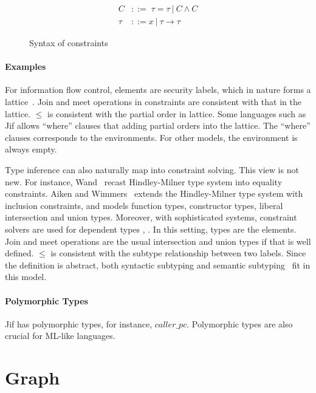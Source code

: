 
\begin{figure}[b]
\begin{align*}
C &::=\; \tau = \tau\ |\ C \land C \\
\tau &::= x\ |\ \tau\rightarrow \tau
\end{align*}
\caption{Syntax of constraints}
\label{figure:cons:syntax}
\end{figure}

\paragraph{Examples}

For information flow control, elements are security labels, which in
nature forms a lattice~\cite{denning-lattice}. Join and meet
operations in constraints are consistent with that in the lattice.
$\leq$ is consistent with the partial order in lattice. Some languages
such as Jif allows ``where'' clauses that adding partial orders into
the lattice. The ``where'' clauses corresponds to the environments.
For other models, the environment is always empty.

Type inference can also naturally map into constraint solving. This
view is not new. For instance, Wand~\cite{wand-typeinference}
recast Hindley-Milner type system into equality constraints. Aiken and
Wimmers~\cite{aiken-typeinclusion} extends the Hindley-Milner type
system with inclusion constraints, and models function types,
constructor types, liberal intersection and union types. Moreover,
with sophisticated systems, constraint solvers are used for dependent
types , . In this setting, types are the
elements. Join and meet operations are the usual intersection and
union types if that is well defined.  $\leq$ is consistent with the
subtype relationship between two labels.  Since the definition is
abstract, both syntactic subtyping  and semantic
subtyping~\cite{aiken-typeinclusion} fit in this model.

\paragraph{Polymorphic Types}

Jif has polymorphic types, for instance, $caller\_pc$. Polymorphic
types are also crucial for ML-like languages.

\section{Graph} 

